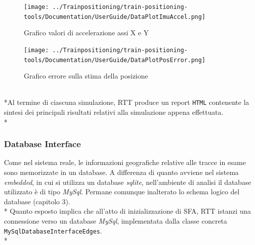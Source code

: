 \begin{figure}[h]
	\centering
	\texttt{[image: ../Trainpositioning/train-positioning-tools/Documentation/UserGuide/DataPlotImuAccel.png]}
	\caption{Grafico valori di accelerazione assi X e Y}
	\label{fig:imuxy}
\end{figure}
\begin{figure}[h]
	\centering
	\texttt{[image: ../Trainpositioning/train-positioning-tools/Documentation/UserGuide/DataPlotPosError.png]}
	\caption{Grafico errore sulla stima della posizione}
	\label{fig:dataplotposerror}
\end{figure}
\\*Al termine di ciascuna simulazione, RTT produce un report \texttt{HTML} contenente la sintesi dei principali risultati relativi alla simulazione appena effettuata.\\*
\subsubsection{Database Interface}
Come nel sistema reale, le informazioni geografiche relative alle tracce in esame sono memorizzate in un database. A differenza di quanto avviene nel sistema \emph{embedded}, in cui si utilizza un database \emph{sqlite}, nell'ambiente di analisi il database utilizzato \`e di tipo \emph{MySql}. Permane comunque inalterato lo schema logico del database (capitolo 3).\\*
Quanto esposto implica che all'atto di inizializzazione di SFA, RTT istanzi una connessione verso un database \emph{MySql}, implementata dalla classe concreta \texttt{MySqlDatabaseInterfaceEdges}.\\*